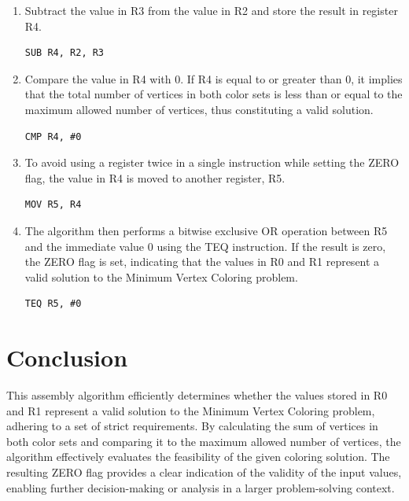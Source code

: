 \begin{enumerate}
\item Subtract the value in R3 from the value in R2 and store the result in register R4.

\begin{verbatim}
SUB R4, R2, R3
\end{verbatim}

\item Compare the value in R4 with 0. If R4 is equal to or greater than 0, it implies that the total number of vertices in both color sets is less than or equal to the maximum allowed number of vertices, thus constituting a valid solution.

\begin{verbatim}
CMP R4, #0
\end{verbatim}

\item To avoid using a register twice in a single instruction while setting the ZERO flag, the value in R4 is moved to another register, R5.

\begin{verbatim}
MOV R5, R4
\end{verbatim}

\item The algorithm then performs a bitwise exclusive OR operation between R5 and the immediate value 0 using the TEQ instruction. If the result is zero, the ZERO flag is set, indicating that the values in R0 and R1 represent a valid solution to the Minimum Vertex Coloring problem.

\begin{verbatim}
TEQ R5, #0
\end{verbatim}
\end{enumerate}

\section{Conclusion}

This assembly algorithm efficiently determines whether the values stored in R0 and R1 represent a valid solution to the Minimum Vertex Coloring problem, adhering to a set of strict requirements. By calculating the sum of vertices in both color sets and comparing it to the maximum allowed number of vertices, the algorithm effectively evaluates the feasibility of the given coloring solution. The resulting ZERO flag provides a clear indication of the validity of the input values, enabling further decision-making or analysis in a larger problem-solving context.



